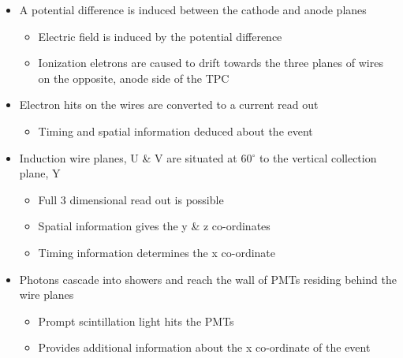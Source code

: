 \begin{itemize} 
    
    \item A potential difference is induced between the cathode and anode planes
    
    \begin{itemize}
        \item Electric field is induced by the potential difference
        \item Ionization eletrons are caused to drift towards the three planes of wires on the opposite, anode side of the TPC
    \end{itemize}

    \item Electron hits on the wires are converted to a current read out 
    
    \begin{itemize}
        \item Timing and spatial information deduced about the event
    \end{itemize}
    
    \item Induction wire planes, U \& V are situated at 60$^{\circ}$ to the vertical collection plane, Y
    
    \begin{itemize}
        \item Full 3 dimensional read out is possible
        \item Spatial information gives the y \& z co-ordinates 
        \item Timing information determines the x co-ordinate
    \end{itemize}

    \item Photons cascade into showers and reach the wall of PMTs residing behind the wire planes

    \begin{itemize}
        \item Prompt scintillation light hits the PMTs
        \item Provides additional information about the x co-ordinate of the event
    \end{itemize}

\end{itemize}

